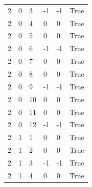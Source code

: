 \documentclass[10pt]{article}
\begin{document}
{\begin{longtable}{@{}llllll@{}}
2 & 0 & 3 & -1 & -1 & True \\
2 & 0 & 4 & 0 & 0 & True \\
2 & 0 & 5 & 0 & 0 & True \\
2 & 0 & 6 & -1 & -1 & True \\
2 & 0 & 7 & 0 & 0 & True \\
2 & 0 & 8 & 0 & 0 & True \\
2 & 0 & 9 & -1 & -1 & True \\
2 & 0 & 10 & 0 & 0 & True \\
2 & 0 & 11 & 0 & 0 & True \\
2 & 0 & 12 & -1 & -1 & True \\
2 & 1 & 1 & 0 & 0 & True \\
2 & 1 & 2 & 0 & 0 & True \\
2 & 1 & 3 & -1 & -1 & True \\
2 & 1 & 4 & 0 & 0 & True \\
\bottomrule
\end{longtable}}
\end{document}
